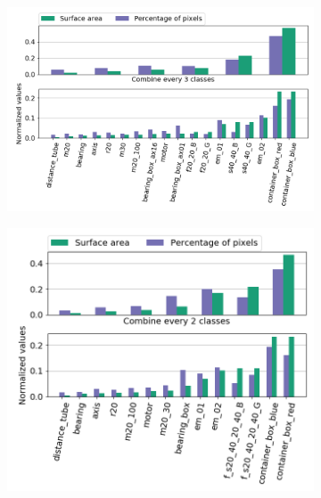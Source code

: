 		\begin{figure}[h]
			\begin{subfigure}{1\textwidth}
				\centering
				\includegraphics[width=1\linewidth]{images/analyzer_full}
				\caption{}
				\label{Fig:analyzera}
			\end{subfigure}
			\begin{subfigure}{.53\textwidth}
				\centering
				\includegraphics[width=1\linewidth]{images/analyzer_size}
				\caption{}
				\label{Fig:analyzerb}
			\end{subfigure}
			\begin{subfigure}{.47\textwidth}
				\centering

\end{subfigure}
\end{figure}
